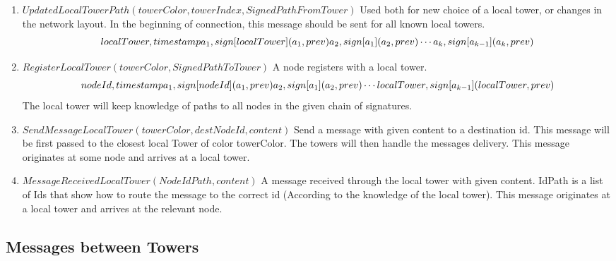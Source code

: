 \documentclass{amsart}
\theoremstyle{definition}
\theoremstyle{remark}
\numberwithin{equation}{section}
\begin{document}
\begin{enumerate}
  \item $UpdatedLocalTowerPath(towerColor, towerIndex, SignedPathFromTower)$
      Used both for new choice of a local tower, or changes in the network
      layout. In the beginning of connection, this message should be sent for
      all known local towers. 
      \[
        localTower,   timestamp                     \\
        a_1,          sign[localTower](a_1, prev)   \\
        a_2,          sign[a_1](a_2, prev)          \\
        \cdots                                      \\
        a_k,          sign[a_{k-1}](a_k, prev)
      \]

  \item $RegisterLocalTower(towerColor, SignedPathToTower)$
      A node registers with a local tower.
      \[
        nodeId,       timestamp                   \\
        a_1,          sign[nodeId](a_1, prev)    \\
        a_2,          sign[a_1](a_2, prev)        \\
        \cdots                                    \\
        localTower,   sign[a_{k-1}](localTower, prev)
      \]
      The local tower will keep knowledge of paths to all nodes in the given
      chain of signatures.


  \item $SendMessageLocalTower(towerColor, destNodeId, content)$
    Send a message with given content to a destination id.
    This message will be first passed to the closest local Tower of color
    towerColor. The towers will then handle the messages delivery. This message
    originates at some node and arrives at a local tower.

  \item $MessageReceivedLocalTower(NodeIdPath, content)$
    A message received through the local tower with given content.
    IdPath is a list of Ids that show how to route the message to the correct
    id (According to the knowledge of the local tower).
    This message originates at a local tower and arrives at the relevant node.

\end{enumerate}


\subsection{Messages between Towers}
\end{document}
